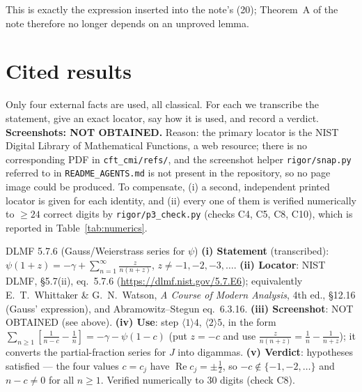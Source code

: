 \documentclass[11pt]{article}
\begin{document}
\noindent
This is exactly the expression inserted into the note's (20); Theorem~A of the note
therefore no longer depends on an unproved lemma.

\section{Cited results}\label{sec:cited}

Only four external facts are used, all classical.  For each we transcribe the statement, give an
exact locator, say how it is used, and record a verdict.  \textbf{Screenshots: NOT OBTAINED.}
Reason: the primary locator is the NIST Digital Library of Mathematical Functions, a web resource;
there is no corresponding PDF in \texttt{cft\_cmi/refs/}, and the screenshot helper
\texttt{rigor/snap.py} referred to in \texttt{README\_AGENTS.md} is not present in the repository, so
no page image could be produced.  To compensate, (i) a second, independent printed locator is given
for each identity, and (ii) every one of them is verified numerically to \(\ge24\) correct digits by
\texttt{rigor/p3\_check.py} (checks C4, C5, C8, C10), which is reported in
Table~\ref{tab:numerics}.

\begin{citedbox}{DLMF 5.7.6 (Gauss/Weierstrass series for \(\psi\))}
\textbf{(i) Statement} (transcribed): \(\displaystyle\psi(1+z)=-\gamma+\sum_{n=1}^{\infty}
\frac{z}{n(n+z)}\), \(z\neq-1,-2,-3,\dots\).
\textbf{(ii) Locator}: NIST DLMF, \S5.7(ii), eq.~5.7.6 (\url{https://dlmf.nist.gov/5.7.E6});
equivalently E.~T.~Whittaker \& G.~N.~Watson, \emph{A Course of Modern Analysis}, 4th ed.,
\S12.16 (Gauss' expression), and Abramowitz--Stegun eq.~6.3.16.
\textbf{(iii) Screenshot}: NOT OBTAINED (see above).
\textbf{(iv) Use}: step \(\langle1\rangle4\), \(\langle2\rangle5\), in the form
\(\sum_{n\ge1}[\frac1{n-c}-\frac1n]=-\gamma-\psi(1-c)\) (put \(z=-c\) and use
\(\frac{z}{n(n+z)}=\frac1n-\frac1{n+z}\)); it converts the partial-fraction series for \(J\) into
digammas.
\textbf{(v) Verdict}: hypotheses satisfied --- the four values \(c=c_j\) have
\(\operatorname{Re}c_j=\pm\frac12\), so \(-c\notin\{-1,-2,\dots\}\) and \(n-c\neq0\) for all
\(n\ge1\).  Verified numerically to \(30\) digits (check C8).
\end{citedbox}
\end{document}
